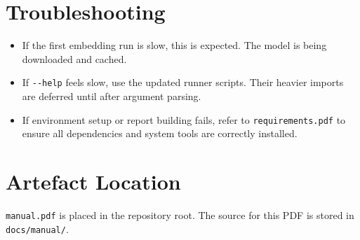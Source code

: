 \documentclass[10pt,a4paper]{article}
\begin{document}
\section{Troubleshooting}

\begin{itemize}
      \item If the first embedding run is slow, this is expected. The model is being downloaded and cached.
      \item If \texttt{-{}-help} feels slow, use the updated runner scripts. Their heavier imports are deferred until after argument parsing.
      \item If environment setup or report building fails, refer to \texttt{requirements.pdf} to ensure all dependencies and system tools are correctly installed.
\end{itemize}


\section{Artefact Location}

\texttt{manual.pdf} is placed in the repository root. The source for this PDF is stored in \texttt{docs/manual/}.
\end{document}

